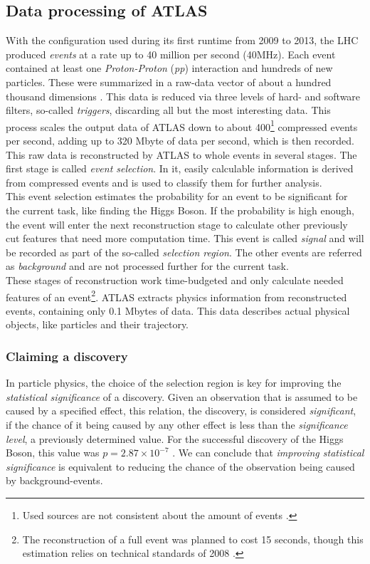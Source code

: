 \subsection{Data processing of ATLAS}
With the configuration used during its first runtime from 2009 to 2013, the LHC produced \emph{events} at a rate up to 40 million per second (40MHz). Each event contained at least one \emph{Proton-Proton} (\emph{pp}) interaction and hundreds of new particles. These were summarized in a raw-data vector of about a hundred thousand dimensions \cite{higgsPaper}. This data is reduced via three levels of hard- and software filters, so-called \emph{triggers}, discarding all but the most interesting data. This process scales the output data of ATLAS down to about 400\footnote{Used sources are not consistent about the amount of events \cite{higgsPaper, glig14, atlasHP}.} compressed events per second, adding up to 320 Mbyte of data per second, which is then recorded. This raw data is reconstructed by ATLAS to whole events in several stages. The first stage is called \emph{event selection}. In it, easily calculable information is derived from compressed events and is used to classify them for further analysis.\\
This event selection estimates the probability for an event to be significant for the current task, like finding the Higgs Boson. 
If the probability is high enough, the event will enter the next reconstruction stage to calculate other previously cut features that need more computation time. This event is called \emph{signal} and will be recorded as part of the so-called \emph{selection region}. The other events are referred as \emph{background} and are not processed further for the current task.\\
These stages of reconstruction work time-budgeted and only calculate needed features of an event\footnote{The reconstruction of a full event was planned to cost 15 seconds, though this estimation relies on technical standards of 2008 \cite{atlasHP}.}.
ATLAS extracts physics information from reconstructed events, containing only 0.1 Mbytes of data. This data describes actual physical objects, like particles and their trajectory.

\subsubsection{Claiming a discovery}
In particle physics, the choice of the selection region is key for improving the \emph{statistical significance} of a discovery. Given an observation that is assumed to be caused by a specified effect, this relation, the discovery, is considered \emph{significant}, if the chance of it being caused by any other effect is less than the \emph{significance level}, a previously determined value.
For the successful discovery of the Higgs Boson, this value was $p = 2.87 \times 10^{-7}$ \cite{higgsPaper}. We can conclude that \emph{improving statistical significance} is equivalent to reducing the chance of the observation being caused by background-events.

